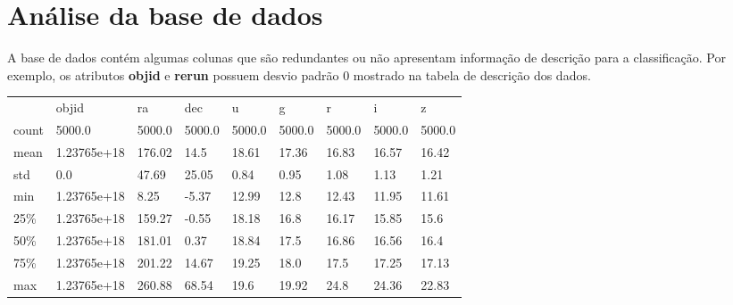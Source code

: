 \section{Análise da base de dados}

A base de dados contém algumas colunas que são redundantes ou não apresentam informação de descrição para a classificação.
Por exemplo, os atributos \textbf{objid} e \textbf{rerun} possuem desvio padrão $0$ mostrado na tabela de descrição dos dados.

\begin{table}[H]
\begin{tabular}{lllllllll}
      & objid       & ra     & dec    & u      & g      & r      & i      & z      \\
count & 5000.0      & 5000.0 & 5000.0 & 5000.0 & 5000.0 & 5000.0 & 5000.0 & 5000.0 \\
mean  & 1.23765e+18 & 176.02 & 14.5   & 18.61  & 17.36  & 16.83  & 16.57  & 16.42  \\
std   & 0.0         & 47.69  & 25.05  & 0.84   & 0.95   & 1.08   & 1.13   & 1.21   \\
min   & 1.23765e+18 & 8.25   & -5.37  & 12.99  & 12.8   & 12.43  & 11.95  & 11.61  \\
25\%  & 1.23765e+18 & 159.27 & -0.55  & 18.18  & 16.8   & 16.17  & 15.85  & 15.6   \\
50\%  & 1.23765e+18 & 181.01 & 0.37   & 18.84  & 17.5   & 16.86  & 16.56  & 16.4   \\
75\%  & 1.23765e+18 & 201.22 & 14.67  & 19.25  & 18.0   & 17.5   & 17.25  & 17.13  \\
max   & 1.23765e+18 & 260.88 & 68.54  & 19.6   & 19.92  & 24.8   & 24.36  & 22.83 
\end{tabular}
\end{table}

